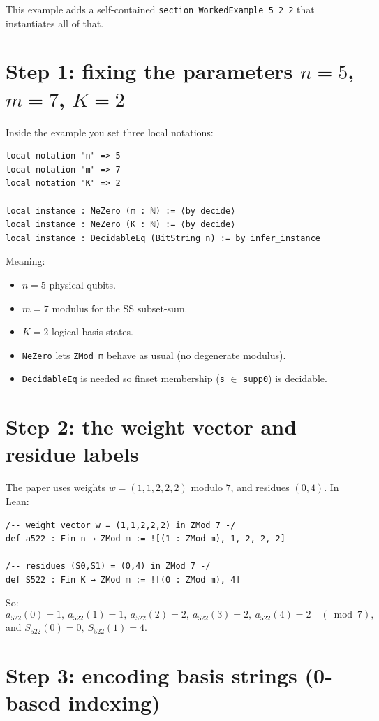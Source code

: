 \documentclass[11pt]{article}
\begin{document}
This example adds a self-contained \texttt{section WorkedExample\_5\_2\_2} that instantiates all of that.

\section*{Step 1: fixing the parameters \(n=5\), \(m=7\), \(K=2\)}

Inside the example you set three local notations:

\begin{lstlisting}
local notation "n" => 5
local notation "m" => 7
local notation "K" => 2

local instance : NeZero (m : ℕ) := ⟨by decide⟩
local instance : NeZero (K : ℕ) := ⟨by decide⟩
local instance : DecidableEq (BitString n) := by infer_instance
\end{lstlisting}

Meaning:
\begin{itemize}
\item \(n=5\) physical qubits.
\item \(m=7\) modulus for the SS subset-sum.
\item \(K=2\) logical basis states.
\item \texttt{NeZero} lets \texttt{ZMod m} behave as usual (no degenerate modulus).
\item \texttt{DecidableEq} is needed so finset membership (\texttt{s} $\in$ \texttt{supp0}) is decidable.
\end{itemize}

\section*{Step 2: the weight vector and residue labels}

The paper uses weights \(w=(1,1,2,2,2)\) modulo \(7\), and residues \((0,4)\).
In Lean:

\begin{lstlisting}
/-- weight vector w = (1,1,2,2,2) in ZMod 7 -/
def a522 : Fin n → ZMod m := ![(1 : ZMod m), 1, 2, 2, 2]

/-- residues (S0,S1) = (0,4) in ZMod 7 -/
def S522 : Fin K → ZMod m := ![(0 : ZMod m), 4]
\end{lstlisting}

So:
\[
a_{522}(0)=1,\ a_{522}(1)=1,\ a_{522}(2)=2,\ a_{522}(3)=2,\ a_{522}(4)=2 \quad (\bmod 7),
\]
and \(S_{522}(0)=0,\ S_{522}(1)=4\).

\section*{Step 3: encoding basis strings (0-based indexing)}
\end{document}
